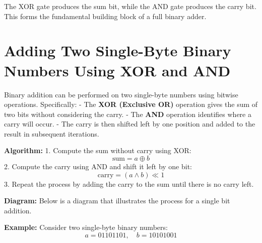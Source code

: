 \documentclass{report}
\begin{document}
The XOR gate produces the sum bit, while the AND gate produces the carry bit. This forms the fundamental building block of a full binary adder.

\section{Adding Two Single-Byte Binary Numbers Using XOR and AND}

Binary addition can be performed on two single-byte numbers using bitwise operations. Specifically:
- The \textbf{XOR (Exclusive OR)} operation gives the sum of two bits without considering the carry.
- The \textbf{AND} operation identifies where a carry will occur.
- The carry is then shifted left by one position and added to the result in subsequent iterations.

\textbf{Algorithm:}
1. Compute the sum without carry using XOR:
   \[
   \text{sum} = a \oplus b
   \]
2. Compute the carry using AND and shift it left by one bit:
   \[
   \text{carry} = (a \land b) \ll 1
   \]
3. Repeat the process by adding the carry to the sum until there is no carry left.

\textbf{Diagram:}
Below is a diagram that illustrates the process for a single bit addition.

\begin{center}
\end{center}

\textbf{Example:}
Consider two single-byte binary numbers:
\[
a = 01101101, \quad b = 10101001
\]
\end{document}
